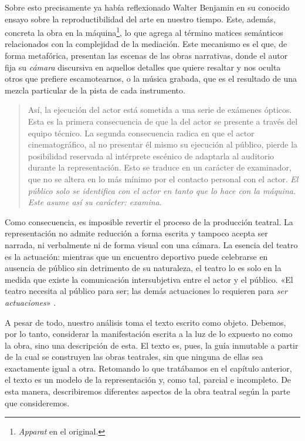 Sobre esto precisamente ya había reflexionado Walter Benjamin en su conocido ensayo sobre la reproductibilidad del arte en nuestro tiempo. Este, además, concreta la obra en la máquina\footnote{\textit{Apparat} en el original.}, lo que agrega al término matices semánticos relacionados con la complejidad de la mediación. Este mecanismo es el que, de forma metafórica, presentan las escenas de las obras narrativas, donde el autor fija su \textit{cámara} discursiva en aquellos detalles que  quiere resaltar y nos oculta otros que prefiere escamotearnos, o la música grabada, que es el resultado de una mezcla particular de la pista de cada instrumento.
\blockquote{Así, la ejecución del actor está sometida a una serie de exámenes ópticos. Esta es la primera consecuencia de que la del actor se presente a través del equipo técnico. La segunda consecuencia radica en que  el actor cinematográfico, al no presentar él mismo su ejecución al público, pierde la posibilidad reservada al intérprete escénico de adaptarla  al auditorio durante la representación. Esto se traduce en un carácter de examinador, que no se altera en lo más mínimo por el contacto personal con el actor. \textit{El público solo se identifica con el actor en tanto que lo hace con la máquina. Este asume así su carácter: examina}. \parencite[pp. 37-38; traducción propia;énfasis en el original]{benjamin2013}}

Como consecuencia, es imposible revertir el proceso de la producción teatral. La representación no admite reducción a forma escrita y tampoco acepta ser narrada, ni verbalmente ni de forma visual con una cámara. La esencia del teatro es la actuación: mientras que un encuentro deportivo puede celebrarse en ausencia de público sin detrimento de su naturaleza, el teatro lo es solo en la medida que existe la comunicación intersubjetiva entre el actor y el público. «El teatro necesita al público para ser; las demás actuaciones lo requieren para \textit{ser actuaciones}» \parencite[p. 59;énfasis en el original]{garcia2020}.

A pesar de todo, nuestro análisis toma el texto escrito como objeto. Debemos, por lo tanto, considerar la manifestación escrita a la luz de lo expuesto no como la obra, sino una descripción de esta. El texto es, pues, la guía inmutable a partir de la cual se construyen las obras teatrales, sin que ninguna de ellas sea exactamente igual a otra. Retomando lo que tratábamos en el capítulo anterior, el texto es un modelo de la representación y, como tal, parcial e incompleto. De esta manera, describiremos diferentes aspectos de la obra teatral según la parte que consideremos.

